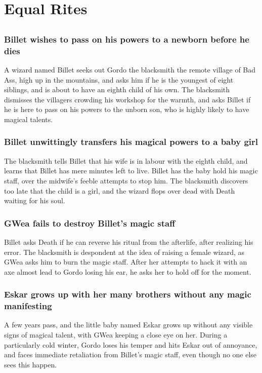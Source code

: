 \section{Equal Rites}


\subsection{}
\subsubsection{\Gls{Billet} wishes to pass on his powers to a newborn before he dies}
A wizard named \Gls{Billet} seeks out \Gls{Gordo} the blacksmith the remote village of Bad Ass,
high up in the mountains, and asks him if he is the youngest of eight siblings, and is about to have
an eighth child of his own. The blacksmith dismisses the villagers crowding his workshop for the
warmth, and asks \Gls{Billet} if he is here to pass on his powers to the unborn son, who is highly
likely to have magical talents.

\subsubsection{\Gls{Billet} unwittingly transfers his magical powers to a baby girl}
The blacksmith tells \Gls{Billet} that his wife is in labour with the eighth child, and learns that
\Gls{Billet} has mere minutes left to live. \Gls{Billet} has the baby hold his magic staff, over
the midwife's feeble attempts to stop him. The blacksmith discovers too late that the child is a
girl, and the wizard flops over dead with \Gls{Death} waiting for his soul.

\subsubsection{\Gls{GWea} fails to destroy \Gls{Billet}'s magic staff}
\Gls{Billet} asks \Gls{Death} if he can reverse his ritual from the afterlife, after realizing his
error. The blacksmith is despondent at the idea of raising a female wizard, as \Gls{GWea} asks him
to burn the magic staff. After her attempts to hack it with an axe almost lead to \Gls{Gordo} losing
his ear, he asks her to hold off for the moment.

\subsubsection{\Gls{Eskar} grows up with her many brothers without any magic manifesting}
A few years pass, and the little baby named \Gls{Eskar} grows up without any visible signs of
magical talent, with \Gls{GWea} keeping a close eye on her. During a particularly cold winter,
\Gls{Gordo} loses his temper and hits \Gls{Eskar} out of annoyance, and faces immediate retaliation
from \Gls{Billet}'s magic staff, even though no one else sees this happen.

